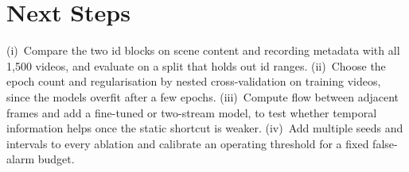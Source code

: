 \documentclass[conference]{IEEEtran}
\begin{document}
\section{Next Steps}
(i)~Compare the two id blocks on scene content and recording metadata with all 1,500 videos, and evaluate on a split that holds out id ranges. (ii)~Choose the epoch count and regularisation by nested cross-validation on training videos,
since the models overfit after a few epochs. (iii)~Compute flow between adjacent frames and add a fine-tuned or two-stream model, to test whether temporal information helps once the static shortcut is weaker.
(iv)~Add multiple seeds and intervals to every ablation and calibrate an operating threshold for a fixed false-alarm budget.



\end{document}
